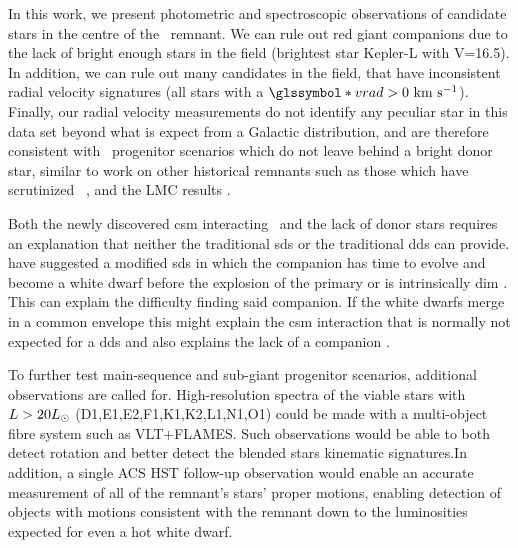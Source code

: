 \documentclass[preprint2]{aastex}
\begin{document}
\label{sec:conclusion}

In this work, we present photometric and spectroscopic observations of candidate stars in the centre of the \ remnant. We can rule out red giant companions due to the lack of bright enough stars in the field (brightest star Kepler-L with V=16.5). In addition, we can rule out many candidates in the field, that have inconsistent radial velocity signatures (all stars with a $\vrad>0~\kms$). Finally, our radial velocity measurements do not identify any peculiar star in this data set beyond what is expect from a Galactic distribution, and are therefore consistent with \snia\ progenitor scenarios which do not leave behind a bright donor star, similar to work on other historical remnants such as those which have scrutinized \ \citep{2012Natur.489..533G,2012ApJ...759....7K}, and the LMC results \citep{2012ApJ...747L..19E, 2012Natur.481..164S}. 

Both the newly discovered \gls{csm} interacting \sneia\ and the lack of donor stars requires an explanation that neither the traditional \gls{sds} or the traditional \gls{dds} can provide. \citet{2011ApJ...730L..34J,2011ApJ...738L...1D,2012ApJ...744...69H,2012ApJ...756L...4H} have suggested a modified \gls{sds} in which the companion has time to evolve and become a white dwarf before the explosion of the primary or is intrinsically dim \citep{2012ApJ...758..123W}. This can explain the difficulty finding said companion. If the white dwarfs merge in a common envelope this might explain the \gls{csm} interaction that is normally not expected for a \gls{dds} and also explains the lack of a companion \citep[][, van Kerkwijk priv. comm. ]{2011MNRAS.417.1466K}.  

To further test main-sequence and sub-giant progenitor scenarios, additional observations are called for. High-resolution spectra of the viable stars with $L>20\hbox{$L_{\odot}$}$ (D1,E1,E2,F1,K1,K2,L1,N1,O1) could be made with a multi-object fibre system such as VLT+FLAMES. Such observations would be able to both detect rotation and better detect the blended stars kinematic signatures.In addition, a single ACS HST follow-up observation would enable an accurate measurement of all of the remnant's stars' proper motions, enabling detection of objects with motions consistent with the remnant down to the luminosities expected for even a hot white dwarf. 
\end{document}
